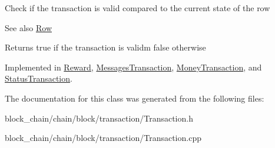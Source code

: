 Check if the transaction is valid compared to the current state of the row \begin{DoxySeeAlso}{See also}
\mbox{\hyperlink{classRow}{Row}}
\end{DoxySeeAlso}
\begin{DoxyReturn}{Returns}
true if the transaction is validm false otherwise 
\end{DoxyReturn}


Implemented in \mbox{\hyperlink{classReward_a9c9a3219ba6b8b068f7f1cccc779b1b5}{Reward}}, \mbox{\hyperlink{classMessagesTransaction_a59a0d03ac175701616ce341947f9cd64}{Messages\+Transaction}}, \mbox{\hyperlink{classMoneyTransaction_a20c58901a2aa8c51b73d56000545e82c}{Money\+Transaction}}, and \mbox{\hyperlink{classStatusTransaction_a828dd6b4d51a33193b69454933be1cf4}{Status\+Transaction}}.



The documentation for this class was generated from the following files\+:\begin{DoxyCompactItemize}
\item 
block\+\_\+chain/chain/block/transaction/Transaction.\+h\item 
block\+\_\+chain/chain/block/transaction/Transaction.\+cpp\end{DoxyCompactItemize}
